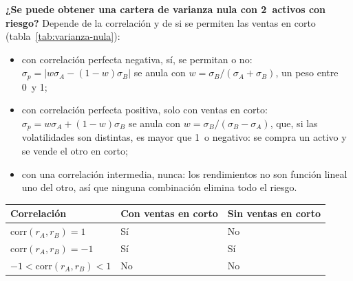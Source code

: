 \documentclass[11pt]{article}
\begin{document}
\begin{anotaciones}
\textbf{¿Se puede obtener una cartera de varianza nula con 2~activos con riesgo?} Depende de la correlación y de si se permiten las ventas en corto (tabla~\ref{tab:varianza-nula}):
\begin{itemize}
\item con correlación perfecta negativa, sí, se permitan o no: $\sigma_p=|w\sigma_A-(1-w)\sigma_B|$ se anula con $w=\sigma_B/(\sigma_A+\sigma_B)$, un peso entre 0~y 1;
\item con correlación perfecta positiva, solo con ventas en corto: $\sigma_p=w\sigma_A+(1-w)\sigma_B$ se anula con $w=\sigma_B/(\sigma_B-\sigma_A)$, que, si las volatilidades son distintas, es mayor que 1~o negativo: se compra un activo y se vende el otro en corto;
\item con una correlación intermedia, nunca: los rendimientos no son función lineal uno del otro, así que ninguna combinación elimina todo el riesgo.
\end{itemize}
\begin{tablacaja}
\centering
\caption{¿Se puede obtener una varianza nula con 2~activos?}\label{tab:varianza-nula}
\small
\begin{tabular}{>{\centering\arraybackslash}m{4.2cm}>{\centering\arraybackslash}m{3.6cm}>{\centering\arraybackslash}m{3.6cm}}
\toprule
\rowcolor{tceeazulpalido}\textbf{Correlación} & \textbf{Con ventas en corto} & \textbf{Sin ventas en corto}\\
\midrule
$\mathrm{corr}(r_A,r_B)=1$ & \textcolor{tceeverde}{Sí} & \textcolor{tceerojo}{No}\\
\addlinespace[0.2em]
$\mathrm{corr}(r_A,r_B)=-1$ & \textcolor{tceeverde}{Sí} & \textcolor{tceeverde}{Sí}\\
\addlinespace[0.2em]
$-1<\mathrm{corr}(r_A,r_B)<1$ & \textcolor{tceerojo}{No} & \textcolor{tceerojo}{No}\\
\bottomrule
\end{tabular}
\end{tablacaja}
\end{anotaciones}
\end{document}
